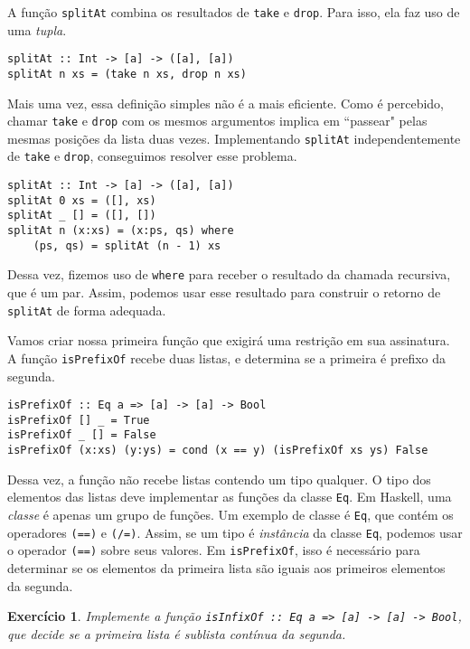 \documentclass[a4paper]{article}
\newtheorem{exercicio}{Exercício}
\begin{document}
A função \texttt{splitAt} combina os resultados de \texttt{take} e \texttt{drop}. Para isso, ela faz uso de uma \emph{tupla}.

\begin{verbatim}
splitAt :: Int -> [a] -> ([a], [a])
splitAt n xs = (take n xs, drop n xs)
\end{verbatim}

Mais uma vez, essa definição simples não é a mais eficiente.
Como é percebido, chamar \texttt{take} e \texttt{drop} com os mesmos argumentos implica em ``passear" pelas mesmas posições da lista duas vezes.
Implementando \texttt{splitAt} independentemente de \texttt{take} e \texttt{drop}, conseguimos resolver esse problema.

\begin{verbatim}
splitAt :: Int -> [a] -> ([a], [a])
splitAt 0 xs = ([], xs)
splitAt _ [] = ([], [])
splitAt n (x:xs) = (x:ps, qs) where
	(ps, qs) = splitAt (n - 1) xs
\end{verbatim}

Dessa vez, fizemos uso de \texttt{where} para receber o resultado da chamada recursiva, que é um par.
Assim, podemos usar esse resultado para construir o retorno de \texttt{splitAt} de forma adequada.

Vamos criar nossa primeira função que exigirá uma restrição em sua assinatura.
A função \texttt{isPrefixOf} recebe duas listas, e determina se a primeira é prefixo da segunda.

\begin{verbatim}
isPrefixOf :: Eq a => [a] -> [a] -> Bool
isPrefixOf [] _ = True
isPrefixOf _ [] = False
isPrefixOf (x:xs) (y:ys) = cond (x == y) (isPrefixOf xs ys) False
\end{verbatim}

Dessa vez, a função não recebe listas contendo um tipo qualquer.
O tipo dos elementos das listas deve implementar as funções da classe \texttt{Eq}.
Em Haskell, uma \emph{classe} é apenas um grupo de funções.
Um exemplo de classe é \texttt{Eq}, que contém os operadores \texttt{(==)} e \texttt{(/=)}.
Assim, se um tipo é \emph{instância} da classe \texttt{Eq}, podemos usar o operador \texttt{(==)} sobre seus valores.
Em \texttt{isPrefixOf}, isso é necessário para determinar se os elementos da primeira lista são iguais aos primeiros elementos da segunda.

\begin{exercicio}	\label{exercicioIsInfixOf}
	Implemente a função \emph{\texttt{isInfixOf :: Eq a => [a] -> [a] -> Bool}}, que decide se a primeira lista é sublista contínua da segunda.
\end{exercicio}
\end{document}
